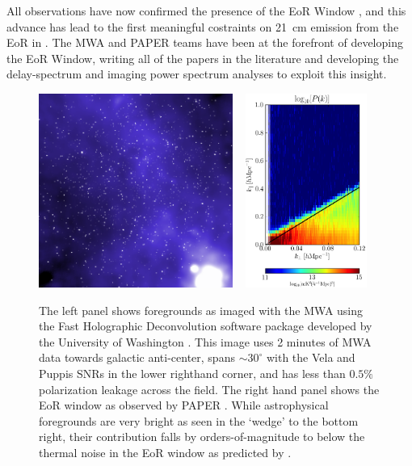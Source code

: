 \documentclass[preprint]{aastex}
\begin{document}
All observations have now confirmed the presence of the EoR Window \citep{pober_et_al2013,dillon_et_al2013b}, and this advance has lead to the first meaningful costraints on 21~cm emission from the EoR in \citet{parsons_et_al2013}. The MWA and PAPER teams have been at the forefront of developing the EoR Window, writing all of the papers in the literature and developing the delay-spectrum and imaging power spectrum analyses to exploit this insight. 




\begin{figure}[t]
\centering
\includegraphics[height=2.5in]{plots/MWApretty.png}
~ %
\includegraphics[height=2.5in]{plots/wedge_tall.png}
\caption{\small
The left panel shows foregrounds as imaged with the MWA using the Fast Holographic Deconvolution software package developed by the University of Washington \citep{sullivan_et_al2012}. This image uses 2 minutes of MWA data towards galactic anti-center, spans $\sim$$30^{\circ}$ with the Vela and Puppis SNRs in the lower righthand corner, and has less than $0.5\%$ polarization leakage across the field. The right hand panel shows the EoR window as observed by PAPER \citep{pober_et_al2013}. While astrophysical foregrounds are very bright as seen in the `wedge' to the bottom right, their contribution falls by orders-of-magnitude to below the thermal noise in the EoR window as predicted by \citep{morales_et_al2012,parsons_et_al2012b,vedantham_2012,hazelton_et_al2013}.
}\label{fig:twoFGViews}
\end{figure}
\end{document}
